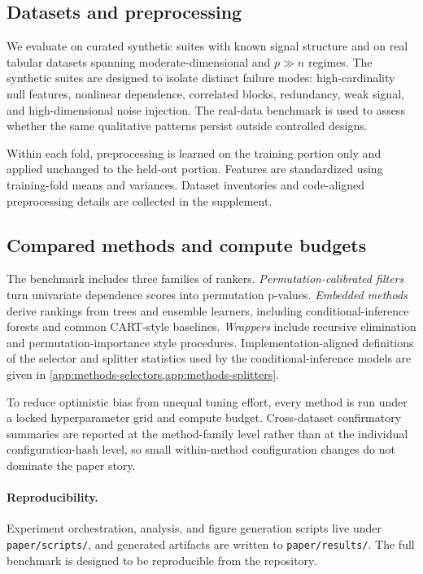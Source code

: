 \subsection{Datasets and preprocessing}
\label{sec:experiments-datasets}

We evaluate on curated synthetic suites with known signal structure and on
real tabular datasets spanning moderate-dimensional and $p \gg n$ regimes. The
synthetic suites are designed to isolate distinct failure modes:
high-cardinality null features, nonlinear dependence, correlated blocks,
redundancy, weak signal, and high-dimensional noise injection. The real-data
benchmark is used to assess whether the same qualitative patterns persist
outside controlled designs.

Within each fold, preprocessing is learned on the training portion only and
applied unchanged to the held-out portion. Features are standardized using
training-fold means and variances. Dataset inventories and code-aligned
preprocessing details are collected in the supplement.

\subsection{Compared methods and compute budgets}
\label{sec:experiments-methods}

The benchmark includes three families of rankers.
\emph{Permutation-calibrated filters} turn univariate dependence scores into
permutation p-values. \emph{Embedded methods} derive rankings from trees and
ensemble learners, including conditional-inference forests and common
CART-style baselines. \emph{Wrappers} include recursive elimination and
permutation-importance style procedures. Implementation-aligned definitions of
the selector and splitter statistics used by the conditional-inference models
are given in \cref{app:methods-selectors,app:methods-splitters}.

To reduce optimistic bias from unequal tuning effort, every method is run
under a locked hyperparameter grid and compute budget. Cross-dataset
confirmatory summaries are reported at the method-family level rather than at
the individual configuration-hash level, so small within-method configuration
changes do not dominate the paper story.

\paragraph{Reproducibility.}
Experiment orchestration, analysis, and figure generation scripts live under
\texttt{paper/scripts/}, and generated artifacts are written to
\texttt{paper/results/}. The full benchmark is designed to be reproducible
from the repository.
